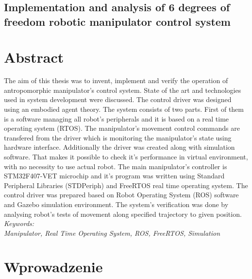 \documentclass[a4paper, 12pt, twoside]{article}
\begin{document}
\newpage
\begin{center}
\section*{Implementation and analysis of 6 degrees of freedom robotic manipulator control system}
\end{center}

\section*{Abstract}
\thispagestyle{empty}
\justify
The aim of this thesis was to invent, implement and verify the operation of antropomorphic manipulator's control system. State of the art and technologies used in system development were discussed. The control driver was designed using an embodied agent theory. The system consists of two parts. First of them is a software managing all robot's peripherals and it is based on a real time operating system (RTOS). The manipulator's movement control commands are transfered from the driver which is monitoring the manipulator's state using hardware interface. Additionally the driver was created along with simulation software. That makes it possible to check it's performance in virtual environment, with no necessity to use actual robot. The main manipulator's controller is STM32F407-VET microchip and it's program was written using Standard Peripheral Libraries (STDPeriph) and FreeRTOS real time operating system. The control driver was prepared based on Robot Operating System (ROS) software and Gazebo simulation environment. The system's verification was done by analysing robot's tests of movement along specified trajectory to given position.
\vspace{0.5 cm}
\\
\textit{Keywords:}
\\
\textit{Manipulator, Real Time Operating System, ROS, FreeRTOS, Simulation}

\newpage



\tableofcontents

\newpage
\justify

\vspace*{1.5 cm}
\section{Wprowadzenie}
\vspace{1.5 cm}
\end{document}
